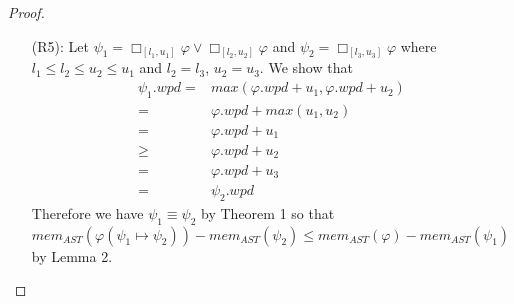 \documentclass{article}
\begin{document}
\begin{proof}
\begin{enumerate}
Next we show that 
\begin{align*}
\psi_1.bpd = & min(\varphi.bpd + l_1, \varphi.wpd + l_2) \\
= & \varphi.bpd + min(l_1, l_2) \\
= & \varphi.bpd + l_1 \\\
= & \psi_2.bpd
\end{align*}
Using Lemma 1 we see that $mem_{node}(\land) = mem_{node}(\Box_{[l_1,u_3]}{})$ since $\psi_1.bpd = \psi_2.bpd$. Then
\begin{align*}
mem_{AST}(\varphi(\psi_1 \mapsto \psi_2)) = & (mem_{AST}(\varphi(\psi_1 \mapsto \psi_2)) - mem_{AST}(\psi_2)) + mem_{AST}(\psi_2) \\
= & (mem_{AST}(\varphi(\psi_1 \mapsto \psi_2)) - mem_{AST}(\psi_2)) + \\
& \qquad mem_{node}(\Box_{[l_1,u_3]}{}) + mem_{AST}(\varphi) \\
\leq & (mem_{AST}(\varphi) - mem_{AST}(\psi_1)) + \\
& \qquad mem_{node}(\Box_{[l_3,u_3]}{}) + mem_{AST}(\varphi) \\
= & (mem_{AST}(\varphi) - mem_{AST}(\psi_1))  + \\
& \qquad mem_{node}(\land) + mem_{AST}(\varphi) \\
\leq & (mem_{AST}(\varphi) - mem_{AST}(\psi_1)) + mem_{node}(\land) + \\
& \qquad mem_{node}(\Box_{[l_1,u_1]}{}) + mem_{node}(\Box_{[l_2,u_2]}{}) + 2 \cdot mem_{AST}(\varphi) \\
= & (mem_{AST}(\varphi) - mem_{AST}(\psi_1)) + mem_{AST}(\psi_1) \\
= & mem_{AST}(\varphi)
\end{align*}
The proof follows for $\lozenge_{[l_1,u_1]}{\varphi} \lor \lozenge_{[l_2,u_2]}{\varphi} \rightarrow \lozenge_{[l_1,u_3]}{\varphi}$. 

    \item[(R5):] Let $\psi_1 = \Box_{[l_1,u_1]}{\varphi} \lor \Box_{[l_2,u_2]}{\varphi}$ and $\psi_2 = \Box_{[l_3,u_3]}{\varphi}$ where $l_1 \leq l_2 \leq u_2 \leq u_1$ and $l_2 = l_3$, $u_2 = u_3$.
We show that 
\begin{align*}
\psi_1.wpd = & max(\varphi.wpd + u_1, \varphi.wpd + u_2) \\
= & \varphi.wpd + max(u_1,u_2) \\
= & \varphi.wpd + u_1 \\
\geq & \varphi.wpd + u_2 \\
= & \varphi.wpd + u_3 \\
= & \psi_2.wpd
\end{align*}
Therefore we have $\psi_1 \equiv \psi_2$ by Theorem 1 so that $mem_{AST}(\varphi(\psi_1 \mapsto \psi_2)) - mem_{AST}(\psi_2)  \leq mem_{AST}(\varphi) - mem_{AST}(\psi_1)$ by Lemma 2.


\end{enumerate}
\end{proof}
\end{document}
